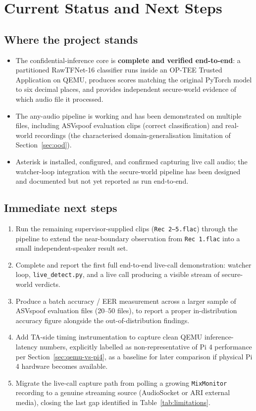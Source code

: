\documentclass[11pt,a4paper]{report}
\newcommand{\code}[1]{\texttt{\small #1}}
\begin{document}
\chapter{Current Status and Next Steps}

\section{Where the project stands}

\begin{itemize}[leftmargin=1.4em]
  \item The confidential-inference core is \textbf{complete and verified end-to-end}: a
  partitioned RawTFNet-16 classifier runs inside an OP-TEE Trusted Application on QEMU, produces
  scores matching the original PyTorch model to six decimal places, and provides independent
  secure-world evidence of which audio file it processed.
  \item The any-audio pipeline is working and has been demonstrated on multiple files, including
  ASVspoof evaluation clips (correct classification) and real-world recordings (the characterised
  domain-generalisation limitation of Section~\ref{sec:ood}).
  \item Asterisk is installed, configured, and confirmed capturing live call audio; the watcher-loop
  integration with the secure-world pipeline has been designed and documented but not yet reported
  as run end-to-end.
\end{itemize}

\section{Immediate next steps}

\begin{enumerate}[leftmargin=1.5em]
  \item Run the remaining supervisor-supplied clips (\code{Rec 2--5.flac}) through the pipeline to
  extend the near-boundary observation from \code{Rec 1.flac} into a small independent-speaker
  result set.
  \item Complete and report the first full end-to-end live-call demonstration: watcher loop,
  \code{live\_detect.py}, and a live call producing a visible stream of secure-world verdicts.
  \item Produce a batch accuracy / EER measurement across a larger sample of ASVspoof evaluation
  files (20--50 files), to report a proper in-distribution accuracy figure alongside the
  out-of-distribution findings.
  \item Add TA-side timing instrumentation to capture clean QEMU inference-latency numbers, explicitly
  labelled as non-representative of Pi 4 performance per Section~\ref{sec:qemu-vs-pi4}, as a
  baseline for later comparison if physical Pi 4 hardware becomes available.
  \item Migrate the live-call capture path from polling a growing \code{MixMonitor} recording to a
  genuine streaming source (AudioSocket or ARI external media), closing the last gap identified in
  Table~\ref{tab:limitations}.
\end{enumerate}
\end{document}
